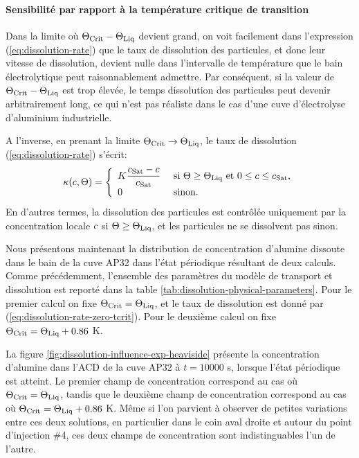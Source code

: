 \paragraph{Sensibilité par rapport à la température critique de transition}


Dans la limite où $\Theta_\text{Crit} - \Theta_\text{Liq}$ devient grand, on voit facilement
dans l'expression (\ref{eq:dissolution-rate}) que le taux de
dissolution des particules, et donc leur vitesse de dissolution,
devient nulle dans l'intervalle de température que le bain
électrolytique peut raisonnablement admettre. Par conséquent, si la
valeur de $\Theta_\text{Crit} - \Theta_\text{Liq}$ est trop élevée, le temps dissolution des
particules peut devenir arbitrairement long, ce qui n'est pas réaliste
dans le cas d'une cuve d'électrolyse d'aluminium industrielle.

A l'inverse, en prenant la limite $\Theta_\text{Crit} \to  \Theta_\text{Liq}$, le taux de
dissolution (\ref{eq:dissolution-rate}) s'écrit:
\begin{equation}\label{eq:dissolution-rate-zero-tcrit}
  \kappa(c,\Theta) = \left\{
  \begin{array}{ll}
  K \displaystyle\frac{c_\text{Sat} - c}{c_\text{Sat}}& \text{ si } \Theta
  \geq \Theta_\text{Liq}\text{ et } 0\leq c \leq c_\text{Sat},\\
  0 &  \text{ sinon.}
  \end{array}
  \right.
\end{equation}
En d'autres termes, la dissolution des particules est contrôlée
uniquement par la concentration locale $c$ si
$\Theta \geq \Theta_\text{Liq}$, et les particules ne se dissolvent pas sinon.

Nous présentons maintenant la distribution de concentration d'alumine
dissoute dans le bain de la cuve AP32 dans l'état périodique résultant
de deux calculs. Comme précédemment, l'ensemble des paramètres du
modèle de transport et dissolution est reporté dans la table
\ref{tab:dissolution-physical-parameters}. Pour le premier calcul on
fixe $\Theta_\text{Crit} = \Theta_\text{Liq}$, et le taux de dissolution est donné par
(\ref{eq:dissolution-rate-zero-tcrit}). Pour le deuxième calcul on
fixe $\Theta_\text{Crit} = \Theta_\text{Liq} + 0.86$ \si{\kelvin}.

La figure \ref{fig:dissolution-influence-exp-heaviside} présente la
concentration d'alumine dans l'ACD de la cuve AP32 à $t = \num{10000}$
\si{\second}, lorsque l'état périodique est atteint. Le premier champ
de concentration correspond au cas où $\Theta_\text{Crit} = \Theta_\text{Liq}$, tandis que le
deuxième champ de concentration correspond au cas où $\Theta_\text{Crit} = \Theta_\text{Liq} +
0.86$ \si{\kelvin}. Même si l'on parvient à observer de petites
variations entre ces deux solutions, en particulier dans le coin aval
droite et autour du point d'injection \#4, ces deux champs de
concentration sont indistinguables l'un de l'autre.

